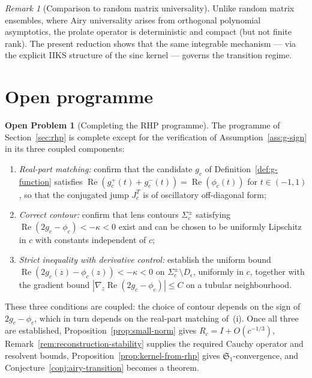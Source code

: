 \documentclass[12pt,a4paper]{amsart}
\theoremstyle{definition}
\newtheorem{problem}[theorem]{Open Problem}
\theoremstyle{remark}
\newtheorem{remark}[theorem]{Remark}
\begin{document}
\begin{remark}[Comparison to random matrix universality]
\label{rem:rmt-comparison}
Unlike random matrix ensembles, where Airy universality arises
from orthogonal polynomial asymptotics, the prolate operator is
deterministic and compact (but not finite rank).
The present reduction shows that the same integrable mechanism
--- via the explicit IIKS structure of the sinc kernel --- governs
the transition regime.
\end{remark}

\section{Open programme}
\label{sec:open}

\begin{problem}[Completing the RHP programme]
\label{prob:rh-programme}
The programme of Section~\ref{sec:rhp} is complete except for the
verification of Assumption~\ref{ass:g-sign} in its three coupled
components:
\begin{enumerate}[label=(\roman*)]
\item \emph{Real-part matching:}
confirm that the candidate $g_c$ of Definition~\ref{def:g-function}
satisfies
$\operatorname{Re}(g_c^+(t) + g_c^-(t)) = \operatorname{Re}(\phi_c(t))$
for $t \in (-1,1)$, so that the conjugated jump $J_c^T$ is of
oscillatory off-diagonal form;
\item \emph{Correct contour:}
confirm that lens contours $\Sigma_c^\pm$ satisfying
$\operatorname{Re}(2g_c - \phi_c) < -\kappa < 0$ exist and can be
chosen to be uniformly Lipschitz in $c$ with constants independent of $c$;
\item \emph{Strict inequality with derivative control:}
establish the uniform bound
$\operatorname{Re}(2g_c(z)-\phi_c(z)) < -\kappa < 0$
on $\Sigma_c^\pm \setminus D_\epsilon$, uniformly in $c$, together with
the gradient bound $|\nabla_z \operatorname{Re}(2g_c - \phi_c)| \le C$
on a tubular neighbourhood.
\end{enumerate}
These three conditions are coupled: the choice of contour depends on
the sign of $2g_c - \phi_c$, which in turn depends on the real-part
matching of~(i). Once all three are established,
Proposition~\ref{prop:small-norm} gives $R_c = I + O(c^{-1/3})$,
Remark~\ref{rem:reconstruction-stability} supplies the required
Cauchy operator and resolvent bounds,
Proposition~\ref{prop:kernel-from-rhp}
gives $\mathfrak{S}_1$-convergence, and
Conjecture~\ref{conj:airy-transition} becomes a theorem.
\end{problem}
\end{document}
